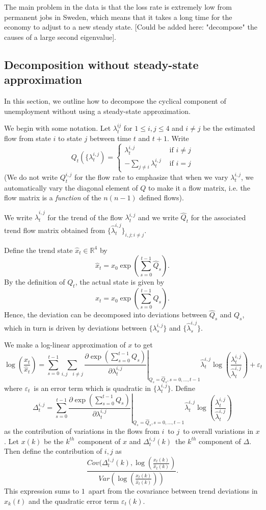 The main problem in the data is that the loss rate is extremely low from permanent jobs in Sweden, which means that it takes a long time for the economy to adjust to a new steady state. [Could be added here: "decompose" the causes of a large second eigenvalue].

\subsection{Decomposition without steady-state approximation}
In this section, we outline how to decompose the cyclical component of unemployment without using a steady-state approximation. 

We begin with some notation. Let $\lambda^{ij}_t$ for $1\le i,j\le 4$ and $i\neq j$ be the estimated flow from state $i$ to state $j$ between time $t$ and $t+1$. Write 
\[
Q_t(\{\lambda^{i,j}_t)=\left\{\begin{array}{cc}
						\lambda^{i,j}_t & \mbox{ if $i\neq j$}\\
						-\sum_{j\neq i} \lambda^{i,j}_t & \mbox{ if $i=j$}\end{array}\right.
\] 
(We do not write $Q^{i,j}_t$ for the flow rate to emphasize that when we vary $\lambda^{i,j}_t$, we automatically vary the diagonal element of $Q$ to make it a flow matrix, i.e. the flow matrix is a \emph{function} of the $n(n-1)$ defined flows).

We write $\hat{\lambda}^{i,j}_t$ for the trend of the flow $\lambda^{i,j}_t$ and we write $\hat{Q}_t$ for the associated trend flow matrix obtained from $\{\hat{\lambda}^{i,j}_t\}_{i,j; i\neq j}$. 

Define the trend state $\hat{x}_t \in \mathbb{R}^4$ by
\[
\hat{x}_t=x_0\exp\left(\sum_{s=0}^{t-1} \hat{Q}_s\right).
\]
By the definition of $Q_t$, the actual state is given by
\[
x_t=x_0\exp\left(\sum_{s=0}^{t-1} Q_s\right).
\]
Hence, the deviation can be decomposed into deviations between $\hat{Q}_s$ and $Q_s$, which in turn is driven by deviations between $\{\lambda^{i,j}_s\}$ and $\{\hat{\lambda}^{i,j}_s\}$. 

We make a log-linear approximation of $x$ to get 
\[
\log\left(\frac{x_t}{\hat{x}_t}\right) = \sum_{s=0}^{t-1} \sum_{i,j \quad i\neq j} \left.\frac{\partial \exp(\sum_{s=0}^{t-1} Q_s)}{\partial \lambda^{i,j}_t}\right|_{Q_s=\hat{Q}_s, s=0,\dots, t-1} \hat{\lambda}^{i,j}_t \log\left(\frac{\lambda_t^{i,j}}{\hat{\lambda}^{i,j}_t}\right)+\varepsilon_t
\]
where $\varepsilon_t$ is an error term which is quadratic in $\{\lambda^{i,j}_t\}$. Define
\[
\Delta^{i,j}_t = \sum_{s=0}^{t-1} \left.\frac{\partial \exp(\sum_{s=0}^{t-1} Q_s)}{\partial \lambda^{i,j}_t}\right|_{Q_s=\hat{Q}_s, s=0,\dots, t-1} \hat{\lambda}^{i,j}_t \log\left(\frac{\lambda_t^{i,j}}{\hat{\lambda}^{i,j}_t}\right)
\]
as the contribution of variations in the flows from $i$ to $j$ to overall variations in $x$. Let $x(k)$ be the $k^{th}$ component of $x$ and $\Delta^{i,j}_t(k)$ the $k^{th}$ component of $\Delta$. Then define the contribution of $i,j$ as
\[
\frac{Cov(\Delta^{i,j}_t(k),\log\left(\frac{x_t(k)}{\hat{x}_t(k)}\right)}{Var\left(\log\left(\frac{x_t(k)}{\hat{x}_t(k)}\right)\right)}.
\]
This expression sums to $1$ apart from the covariance between trend deviations in $x_k(t)$ and the quadratic error term $\varepsilon_t(k)$. 


